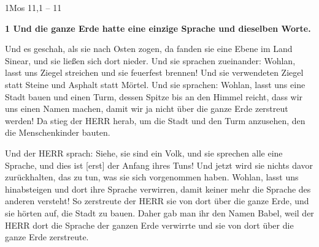 \documentclass[aspectratio=43]{beamer}
\begin{document}
\begin{frame}  
    \vspace*{1cm}
        \begin{exampleblock}{1Mos 11,1 -- 11}
            \color{black}
            \small
            \begin{greenblock}
                \textbf{1 Und die ganze Erde hatte eine einzige Sprache und dieselben Worte.}
            \end{greenblock}
            Und es geschah, als sie nach Osten zogen, da fanden sie eine Ebene im Land Sinear, und sie ließen sich dort nieder.
            Und sie sprachen zueinander: Wohlan, lasst uns Ziegel streichen und sie feuerfest brennen! Und sie verwendeten Ziegel statt Steine und Asphalt statt Mörtel.
            Und sie sprachen: Wohlan, lasst uns eine Stadt bauen und einen Turm, dessen Spitze bis an den Himmel reicht, dass wir uns einen Namen machen, damit wir ja nicht über die ganze Erde zerstreut werden!            
            Da stieg der HERR herab, um die Stadt und den Turm anzusehen, den die Menschenkinder bauten.
            
            Und der HERR sprach: Siehe, sie sind ein Volk, und sie sprechen alle eine Sprache, und dies ist [erst] der Anfang ihres Tuns! Und jetzt wird sie nichts davor zurückhalten, das zu tun, was sie sich vorgenommen haben.
            Wohlan, lasst uns hinabsteigen und dort ihre Sprache verwirren, damit keiner mehr die Sprache des anderen versteht!
            So zerstreute der HERR sie von dort über die ganze Erde, und sie hörten auf, die Stadt zu bauen.
            Daher gab man ihr den Namen Babel, weil der HERR dort die Sprache der ganzen Erde verwirrte und sie von dort über die ganze Erde zerstreute.  
        \end{exampleblock}  
    \vspace*{1cm}
\end{frame}
\end{document}
